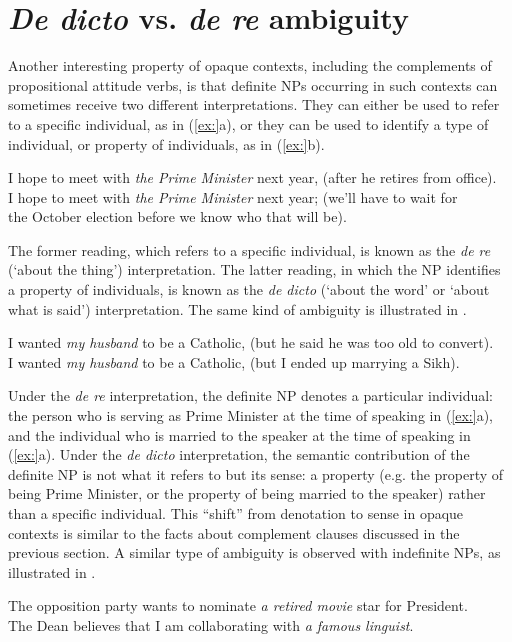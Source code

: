 \section{\textit{De dicto} vs. \textit{de re} ambiguity}\label{sec:12.5}

Another interesting property of opaque contexts, including the complements of propositional attitude verbs, is that definite NPs occurring in such contexts can sometimes receive two different interpretations. They can either be used to refer to a specific individual, as in (\ref{ex:}a), or they can be used to identify a type of individual, or property of individuals, as in (\ref{ex:}b).


\ea
\ea I hope to meet with \textit{the Prime Minister} next year, (after he retires from office).\\
\ex I hope to meet with \textit{the Prime Minister} next year; (we’ll have to wait for\\
  the October election before we know who that will be).
                       \z
\z


The former reading, which refers to a specific individual, is known as the \textit{de re} (‘about the thing’) interpretation. The latter reading, in which the NP identifies a property of individuals, is known as the \textit{de dicto} (‘about the word’ or ‘about what is said’) interpretation. The same kind of ambiguity is illustrated in .


\ea
\ea I wanted \textit{my husband} to be a Catholic, (but he said he was too old to convert).\\
\ex I wanted \textit{my husband} to be a Catholic, (but I ended up marrying a Sikh).
                       \z
\z


Under the \textit{de re} interpretation, the definite NP denotes a particular individual: the person who is serving as Prime Minister at the time of speaking in (\ref{ex:}a), and the individual who is married to the speaker at the time of speaking in (\ref{ex:}a). Under the \textit{de dicto} interpretation, the semantic contribution of the definite NP is not what it refers to but its sense: a property (e.g. the property of being Prime Minister, or the property of being married to the speaker) rather than a specific individual. This “shift” from denotation to sense in opaque contexts is similar to the facts about complement clauses discussed in the previous section. A similar type of ambiguity is observed with indefinite NPs, as illustrated in .


\ea
\ea The opposition party wants to nominate \textit{a retired movie} star for President.\\
\ex The Dean believes that I am collaborating with \textit{a famous linguist}.
                       \z
\z


